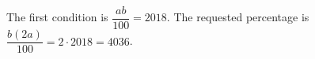The first condition is $\dfrac{ab}{100}=2018$. The requested percentage is $\dfrac{b(2a)}{100}=2\cdot2018=\boxed{4036}$.
